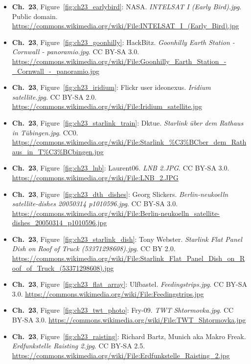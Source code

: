 \begin{small}
\begin{itemize}[leftmargin=0pt,itemsep=2pt,label={}]
\item \textbf{Ch.~23}, Figure~\ref{fig:ch23_earlybird}: NASA. \emph{INTELSAT I (Early Bird).\allowbreak{}jpg}. Public domain. \url{https://commons.wikimedia.org/wiki/File:INTELSAT_I_(Early_Bird).jpg}
\item \textbf{Ch.~23}, Figure~\ref{fig:ch23_goonhilly}: HackBitz. \emph{Goonhilly Earth Station -\allowbreak{} Cornwall -\allowbreak{} panoramio.\allowbreak{}jpg}. CC BY-SA 3.0. \url{https://commons.wikimedia.org/wiki/File:Goonhilly_Earth_Station_-_Cornwall_-_panoramio.jpg}
\item \textbf{Ch.~23}, Figure~\ref{fig:ch23_iridium}: Flickr user ideonexus. \emph{Iridium satellite.\allowbreak{}jpg}. CC BY-SA 2.0. \url{https://commons.wikimedia.org/wiki/File:Iridium_satellite.jpg}
\item \textbf{Ch.~23}, Figure~\ref{fig:ch23_starlink_train}: Dktue. \emph{Starlink über dem Rathaus in Tübingen.\allowbreak{}jpg}. CC0. \url{https://commons.wikimedia.org/wiki/File:Starlink_%C3%BCber_dem_Rathaus_in_T%C3%BCbingen.jpg}
\item \textbf{Ch.~23}, Figure~\ref{fig:ch23_lnb}: Laurent06. \emph{LNB 2.\allowbreak{}JPG}. CC BY-SA 3.0. \url{https://commons.wikimedia.org/wiki/File:LNB_2.JPG}
\item \textbf{Ch.~23}, Figure~\ref{fig:ch23_dth_dishes}: Georg Slickers. \emph{Berlin-\allowbreak{}neukoelln satellite-\allowbreak{}dishes 20050314 p1010596.\allowbreak{}jpg}. CC BY-SA 3.0. \url{https://commons.wikimedia.org/wiki/File:Berlin-neukoelln_satellite-dishes_20050314_p1010596.jpg}
\item \textbf{Ch.~23}, Figure~\ref{fig:ch23_starlink_dish}: Tony Webster. \emph{Starlink Flat Panel Dish on Roof of Truck (53371298608).\allowbreak{}jpg}. CC BY 2.0. \url{https://commons.wikimedia.org/wiki/File:Starlink_Flat_Panel_Dish_on_Roof_of_Truck_(53371298608).jpg}
\item \textbf{Ch.~23}, Figure~\ref{fig:ch23_flat_array}: Ulfbastel. \emph{Feedingstrips.\allowbreak{}jpg}. CC BY-SA 3.0. \url{https://commons.wikimedia.org/wiki/File:Feedingstrips.jpg}
\item \textbf{Ch.~23}, Figure~\ref{fig:ch23_twt_photo}: Fry-09. \emph{TWT Shtormovka.\allowbreak{}jpg}. CC BY-SA 3.0. \url{https://commons.wikimedia.org/wiki/File:TWT_Shtormovka.jpg}
\item \textbf{Ch.~23}, Figure~\ref{fig:ch23_raisting}: Richard Bartz, Munich aka Makro Freak. \emph{Erdfunkstelle Raisting 2.\allowbreak{}jpg}. CC BY-SA 2.5. \url{https://commons.wikimedia.org/wiki/File:Erdfunkstelle_Raisting_2.jpg}

\end{itemize}
\end{small}

